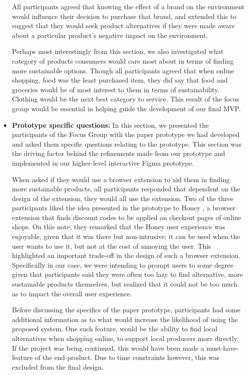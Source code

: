 \documentclass[a4,10pt,twocolumn]{article}
\begin{document}
\begin{itemize}
    \par All participants agreed that knowing the effect of a brand on the environment would influence their decision to purchase that brand, and extended this to suggest that they would seek product alternatives if they were made aware about a particular product's negative impact on the environment. 

    \par Perhaps most interestingly from this section, we also investigated what category of products consumers would care most about in terms of finding more sustainable options. Though all participants agreed that when online shopping, food was the least purchased item, they did say that food and groceries would be of most interest to them in terms of sustainability. Clothing would be the next best category to service. This result of the focus group would be essential in helping guide the development of our final MVP. 

    \item \textbf{Prototype specific questions:} In this section, we presented the participants of the Focus Group with the paper prototype we had developed and asked them specific questions relating to the prototype. This section was the driving factor behind the refinements made from our prototype and implemented in our higher-level interactive Figma prototype.

    When asked if they would use a browser extension to aid them in finding more sustainable products, all participants responded that dependent on the design of the extension, they would all use the extension. Two of the three participants liked the idea presented in the prototype to Honey \cite{Honey}, a browser extension that finds discount codes to be applied on checkout pages of online shops. On this note, they remarked that the Honey user experience was enjoyable, given that it was there but non-intrusive; it can be used when the user wants to use it, but not at the cost of annoying the user. This highlighted an important trade-off in the design of such a browser extension. Specifically in our case, we were intending to prompt users to some degree given that participants said they were often too lazy to find alternative, more sustainable products themselves, but realized that it could not be too much as to impact the overall user experience. 

    Before discussing the specifics of the paper prototype, participants had some additional information as to what would increase the likelihood of using the proposed system. One such feature, would be the ability to find local alternatives when shopping online, to support local producers more directly. If the project was being continued, this would have been made a must-have-feature of the end-product. Due to time constraints however, this was excluded from the final design. 


\end{itemize}
\end{document}
